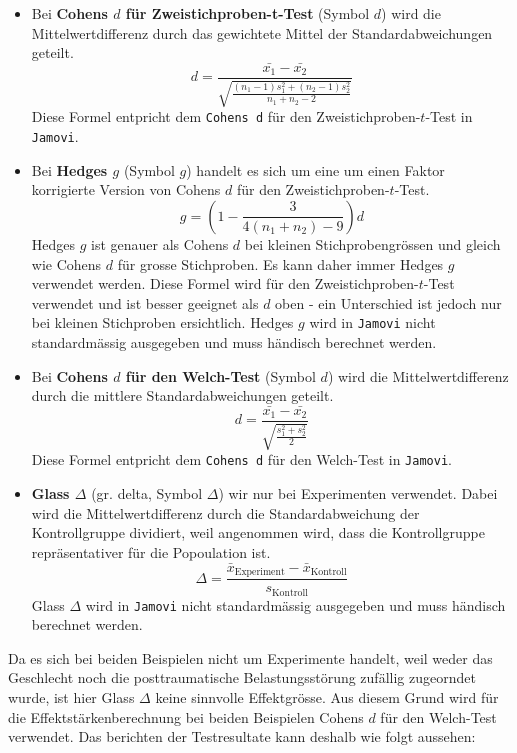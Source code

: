 \documentclass[
]{book}
\providecommand{\tightlist}{%
  \setlength{\itemsep}{0pt}\setlength{\parskip}{0pt}}
\theoremstyle{definition}
\theoremstyle{definition}
\theoremstyle{definition}
\theoremstyle{definition}
\theoremstyle{remark}
\begin{document}
\begin{itemize}
\tightlist
\item
  \label{customdef-cohens-d}{Bei \textbf{Cohens \(d\) für Zweistichproben-t-Test} (Symbol \(d\)) wird die Mittelwertdifferenz durch das gewichtete Mittel der Standardabweichungen geteilt.}
  \[d = \frac{\bar{x_1}-\bar{x_2}}{\sqrt{\frac{(n_1 - 1) s_1^2+(n_2-1)s_2^2}{n_1 + n_2 - 2}}}\]
  Diese Formel entpricht dem \texttt{Cohens\ d} für den Zweistichproben-\(t\)-Test in \texttt{Jamovi}.
\item
  \label{customdef-hedges-g}{Bei \textbf{Hedges \(g\)} (Symbol \(g\)) handelt es sich um eine um einen Faktor korrigierte Version von Cohens \(d\) für den Zweistichproben-\(t\)-Test.}
  \[g = \left(1-\frac{3}{4(n_1+n_2)-9}\right)d\]
  Hedges \(g\) ist genauer als Cohens \(d\) bei kleinen Stichprobengrössen und gleich wie Cohens \(d\) für grosse Stichproben. Es kann daher immer Hedges \(g\) verwendet werden. Diese Formel wird für den Zweistichproben-\(t\)-Test verwendet und ist besser geeignet als \(d\) oben - ein Unterschied ist jedoch nur bei kleinen Stichproben ersichtlich. Hedges \(g\) wird in \texttt{Jamovi} nicht standardmässig ausgegeben und muss händisch berechnet werden.
\item
  \label{customdef-welch-cohens-d}{Bei \textbf{Cohens \(d\) für den Welch-Test} (Symbol \(d\)) wird die Mittelwertdifferenz durch die mittlere Standardabweichungen geteilt.}
  \[d = \frac{\bar{x_1}-\bar{x_2}}{\sqrt{\frac{s_1^2+s_2^2}{2}}}\]
  Diese Formel entpricht dem \texttt{Cohens\ d} für den Welch-Test in \texttt{Jamovi}.
\item
  \label{customdef-glass-delta}{\textbf{Glass \(\Delta\)} (gr. delta, Symbol \(\Delta\)) wir nur bei Experimenten verwendet. Dabei wird die Mittelwertdifferenz durch die Standardabweichung der Kontrollgruppe dividiert, weil angenommen wird, dass die Kontrollgruppe repräsentativer für die Popoulation ist.}
  \[\Delta = \frac{\bar{x}_\text{Experiment}-\bar{x}_\text{Kontroll}}{s_\text{Kontroll}}\]
  Glass \(\Delta\) wird in \texttt{Jamovi} nicht standardmässig ausgegeben und muss händisch berechnet werden.
\end{itemize}

Da es sich bei beiden Beispielen nicht um Experimente handelt, weil weder das Geschlecht noch die posttraumatische Belastungsstörung zufällig zugeorndet wurde, ist hier Glass \(\Delta\) keine sinnvolle Effektgrösse. Aus diesem Grund wird für die Effektstärkenberechnung bei beiden Beispielen Cohens \(d\) für den Welch-Test verwendet. Das berichten der Testresultate kann deshalb wie folgt aussehen:
\end{document}
